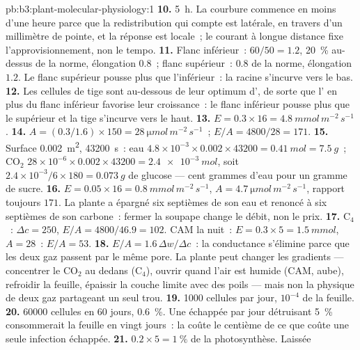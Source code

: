\begin{solution}{pb:b3:plant-molecular-physiology:1}
\textbf{10.} \qty{5}{h}. La courbure commence en moins d'une heure parce
que la redistribution qui compte est latérale, en travers d'un
millimètre de pointe, et la réponse est locale~; le courant à longue
distance fixe l'approvisionnement, non le tempo.
\textbf{11.} Flanc inférieur~: $60/50 = 1.2$,  \qty{20}{\%}
au-dessus de la norme, élongation $0.8$~; flanc supérieur~: $0.8$ de la
norme, élongation $1.2$. Le flanc supérieur pousse plus que l'inférieur~:
la racine s'incurve vers le bas.
\textbf{12.} Les cellules de tige sont au-dessous de leur optimum
d', de sorte que l' en plus du flanc inférieur favorise leur
croissance~: le flanc inférieur pousse plus que le supérieur et la tige
s'incurve vers le haut.
\textbf{13.} $E = 0.3\times 16 = \qty{4.8}{mmol\,m^{-2}\,s^{-1}}$.
\textbf{14.} $A = (0.3/1.6)\times 150 = \qty{28}{\micro mol\,m^{-2}\,s^{-1}}$~;
$E/A = 4800/28 = 171$.
\textbf{15.} Surface \qty{0.002}{m^2}, \num{43200}~s~: eau $4.8\times
10^{-3}\times 0.002\times\num{43200} = \qty{0.41}{mol} = \qty{7.5}{g}$~;
CO$_{2}$ $28\times 10^{-6}\times 0.002\times\num{43200} =
\qty{2.4e-3}{mol}$, soit $2.4\times 10^{-3}/6\times 180 =
\qty{0.073}{g}$ de glucose --- cent grammes d'eau pour un gramme de
sucre.
\textbf{16.} $E = 0.05\times 16 = \qty{0.8}{mmol\,m^{-2}\,s^{-1}}$,
$A = \qty{4.7}{\micro mol\,m^{-2}\,s^{-1}}$, rapport toujours $171$. La
plante a épargné six septièmes de son eau et renoncé à six septièmes de
son carbone~: fermer la soupape change le débit, non le prix.
\textbf{17.} C$_{4}$~: $\Delta c = 250$, $E/A = 4800/46.9 = 102$. CAM la
nuit~: $E = 0.3\times 5 = \qty{1.5}{mmol}$, $A = 28$~: $E/A = 53$.
\textbf{18.} $E/A = 1.6\,\Delta w/\Delta c$~: la conductance s'élimine
parce que les deux gaz passent par le même pore. La plante peut changer
les gradients --- concentrer le CO$_{2}$ au dedans (C$_{4}$), ouvrir
quand l'air est humide (CAM, aube), refroidir la feuille, épaissir la
couche limite avec des poils --- mais non la physique de deux gaz
partageant un seul trou.
\textbf{19.} \num{1000} cellules par jour, $10^{-4}$ de la feuille.
\textbf{20.} \num{60000} cellules en 60 jours, \qty{0.6}{\%}. Une
échappée par jour détruisant \qty{5}{\%} consommerait la feuille en
vingt jours~: la  coûte le centième de ce que
coûte une seule infection échappée.
\textbf{21.} $0.2\times 5 = \qty{1}{\%}$ de la photosynthèse. Laissée

\end{solution}
